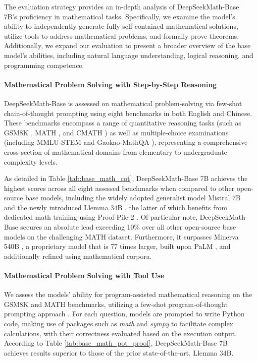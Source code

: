 The evaluation strategy provides an in-depth analysis of DeepSeekMath-Base 7B’s proficiency in mathematical tasks. Specifically, we examine the model's ability to independently generate fully self-contained mathematical solutions, utilize tools to address mathematical problems, and formally prove theorems. Additionally, we expand our evaluation to present a broader overview of the base model’s abilities, including natural language understanding, logical reasoning, and programming competence.

\paragraph{Mathematical Problem Solving with Step-by-Step Reasoning}

DeepSeekMath-Base is assessed on mathematical problem-solving via few-shot chain-of-thought prompting \citep{cot} using eight benchmarks in both English and Chinese. These benchmarks encompass a range of quantitative reasoning tasks (such as GSM8K \citep{gsm8k}, MATH \citep{MATH}, and CMATH \citep{wei2023cmath}) as well as multiple-choice examinations (including MMLU-STEM \citep{mmlu} and Gaokao-MathQA \citep{agieval}), representing a comprehensive cross-section of mathematical domains from elementary to undergraduate complexity levels.

As detailed in Table \ref{tab:base_math_cot}, DeepSeekMath-Base 7B achieves the highest scores across all eight assessed benchmarks when compared to other open-source base models, including the widely adopted generalist model Mistral 7B \citep{mistral} and the newly introduced Llemma 34B \citep{llemma}, the latter of which benefits from dedicated math training using Proof-Pile-2 \citep{llemma}. Of particular note, DeepSeekMath-Base secures an absolute lead exceeding 10\% over all other open-source base models on the challenging MATH dataset. Furthermore, it surpasses Minerva 540B \citep{minerva}, a proprietary model that is 77 times larger, built upon PaLM \citep{palm}, and additionally refined using mathematical corpora.

\paragraph{Mathematical Problem Solving with Tool Use} We assess the models’ ability for program-assisted mathematical reasoning on the GSM8K and MATH benchmarks, utilizing a few-shot program-of-thought prompting approach \citep{pot,pal}. For each question, models are prompted to write Python code, making use of packages such as \textit{math} and \textit{sympy} to facilitate complex calculations, with their correctness evaluated based on the execution output. According to Table \ref{tab:base_math_pot_proof}, DeepSeekMath-Base 7B achieves results superior to those of the prior state-of-the-art, Llemma 34B.

